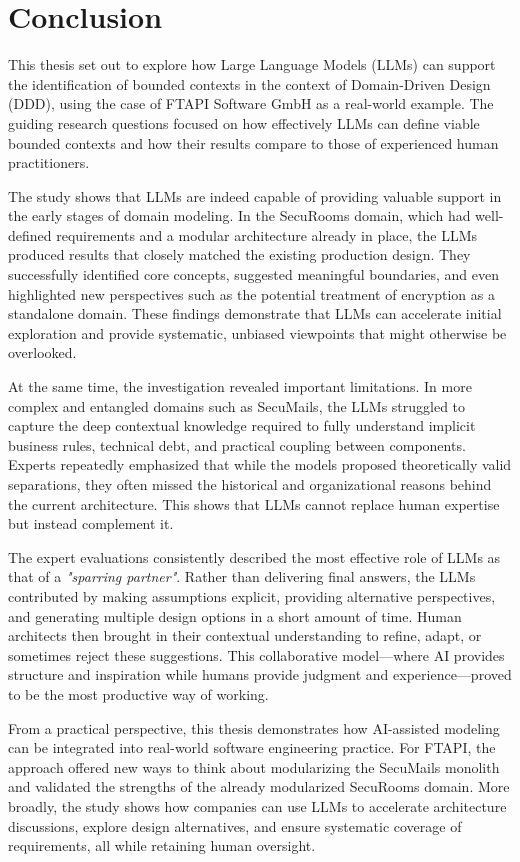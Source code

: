 \section{Conclusion}

This thesis set out to explore how Large Language Models (LLMs) can support the identification of bounded contexts in the context of Domain-Driven Design (DDD), using the case of FTAPI Software GmbH as a real-world example. The guiding research questions focused on how effectively LLMs can define viable bounded contexts and how their results compare to those of experienced human practitioners.  

The study shows that LLMs are indeed capable of providing valuable support in the early stages of domain modeling. In the SecuRooms domain, which had well-defined requirements and a modular architecture already in place, the LLMs produced results that closely matched the existing production design. They successfully identified core concepts, suggested meaningful boundaries, and even highlighted new perspectives such as the potential treatment of encryption as a standalone domain. These findings demonstrate that LLMs can accelerate initial exploration and provide systematic, unbiased viewpoints that might otherwise be overlooked.  

At the same time, the investigation revealed important limitations. In more complex and entangled domains such as SecuMails, the LLMs struggled to capture the deep contextual knowledge required to fully understand implicit business rules, technical debt, and practical coupling between components. Experts repeatedly emphasized that while the models proposed theoretically valid separations, they often missed the historical and organizational reasons behind the current architecture. This shows that LLMs cannot replace human expertise but instead complement it.  

The expert evaluations consistently described the most effective role of LLMs as that of a \textit{"sparring partner"}. Rather than delivering final answers, the LLMs contributed by making assumptions explicit, providing alternative perspectives, and generating multiple design options in a short amount of time. Human architects then brought in their contextual understanding to refine, adapt, or sometimes reject these suggestions. This collaborative model—where AI provides structure and inspiration while humans provide judgment and experience—proved to be the most productive way of working.

From a practical perspective, this thesis demonstrates how AI-assisted modeling can be integrated into real-world software engineering practice. For FTAPI, the approach offered new ways to think about modularizing the SecuMails monolith and validated the strengths of the already modularized SecuRooms domain. More broadly, the study shows how companies can use LLMs to accelerate architecture discussions, explore design alternatives, and ensure systematic coverage of requirements, all while retaining human oversight.

